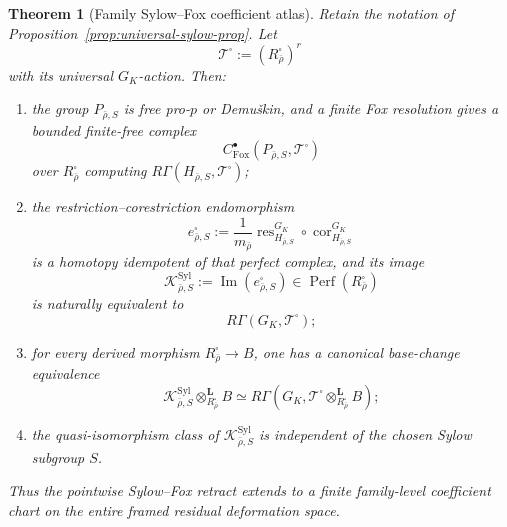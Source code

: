 \documentclass[11pt]{article}
\newtheorem{theorem}{Theorem}[section]
\theoremstyle{definition}
\newcommand{\Perf}{\operatorname{Perf}}
\begin{document}
\begin{theorem}[Family Sylow--Fox coefficient atlas]\label{thm:family-sylow-fox}
Retain the notation of Proposition~\ref{prop:universal-sylow-prop}.  Let
\[
\mathcal T^{\square}:=(R_{\bar\rho}^{\square})^r
\]
with its universal $G_K$-action.  Then:
\begin{enumerate}[label=\textnormal{(\roman*)}]
\item the group $P_{\bar\rho,S}$ is free pro-$p$ or Demu\v{s}kin, and a finite Fox resolution gives a bounded finite-free complex
\[
C^\bullet_{\mathrm{Fox}}
(P_{\bar\rho,S},\mathcal T^{\square})
\]
over $R_{\bar\rho}^{\square}$ computing
$R\Gamma(H_{\bar\rho,S},\mathcal T^{\square})$;
\item the restriction--corestriction endomorphism
\begin{equation}\label{eq:family-sylow-idempotent}
 e_{\bar\rho,S}^{\square}
 :=
 \frac1{m_{\bar\rho}}
 \operatorname{res}_{H_{\bar\rho,S}}^{G_K}
 \circ
 \operatorname{cor}_{H_{\bar\rho,S}}^{G_K}
\end{equation}
is a homotopy idempotent of that perfect complex, and its image
\[
\mathcal K_{\bar\rho,S}^{\mathrm{Syl}}
:=\operatorname{Im}(e_{\bar\rho,S}^{\square})
\in\Perf(R_{\bar\rho}^{\square})
\]
is naturally equivalent to
\[
R\Gamma(G_K,\mathcal T^{\square});
\]
\item for every derived morphism
$R_{\bar\rho}^{\square}\to B$, one has a canonical base-change equivalence
\begin{equation}\label{eq:family-sylow-base-change}
\mathcal K_{\bar\rho,S}^{\mathrm{Syl}}
\otimes_{R_{\bar\rho}^{\square}}^{\mathbf L}B
\simeq
R\Gamma
\left(
G_K,
\mathcal T^{\square}
\otimes_{R_{\bar\rho}^{\square}}^{\mathbf L}B
\right);
\end{equation}
\item the quasi-isomorphism class of
$\mathcal K_{\bar\rho,S}^{\mathrm{Syl}}$
is independent of the chosen Sylow subgroup $S$.
\end{enumerate}
Thus the pointwise Sylow--Fox retract extends to a finite family-level coefficient chart on the entire framed residual deformation space.
\end{theorem}
\end{document}
